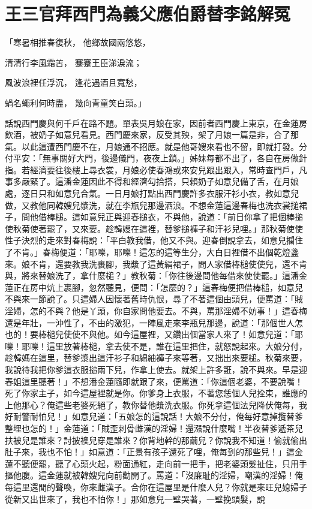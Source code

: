 %

\chapter{王三官拜西門為義父\KG 應伯爵替李銘解冤}


「寒暑相推春復秋，  他鄉故國兩悠悠，

清清行李風霜苦，  蹇蹇王臣涕淚流；

風波浪裡任浮沉，  逢花遇酒且寬愁，

蝸名蠅利何時盡，  幾向青童笑白頭。」

話說西門慶與何千戶在路不題。單表吳月娘在家，因前者西門慶上東京，在金蓮房飲酒，被奶子如意兒看見。西門慶來家，反受其殃，架了月娘一篇是非，合了那氣。以此這遭西門慶不在，月娘通不招應。就是他哥嫂來看也不留，即就打發。分付平安：「無事關好大門，後邊儀門，夜夜上鎖。」姊妹每都不出了，各自在房做針指。若經濟要往後樓上尋衣裳，月娘必使春鴻或來安兒跟出跟入，常時查門戶，凡事多嚴緊了。這潘金蓮因此不得和經濟勾拾搭，只賴奶子如意兒備了舌，在月娘處，逐日只和如意兒合氣。一日月娘打點出西門慶許多衣服汗衫小衣，教如意兒做，又教他同韓嫂兒漿洗，就在李瓶兒那邊洒浪。不想金蓮這邊春梅也洗衣裳搥裙子，問他借棒槌。這如意兒正與迎春搥衣，不與他，說道：「前日你拿了把個棒搥使秋菊使著罷了，又來要。趁韓嫂在這裡，替爹搥褲子和汗衫兒哩。」那秋菊使使性子決烈的走來對春梅說：「平白教我借，他又不與。迎春倒說拿去，如意兒攔住了不肯。」春梅便道：「耶嚛，耶嚛！這怎的這等生分，大白日裡借不出個乾燈盞來。娘不肯，還要教我洗裹腳，我漿了這黃絹裙子，問人家借棒槌使使兒，還不肯與，將來替娘洗了，拿什麼槌？」教秋菊：「你往後邊問他每借來使使罷。」這潘金蓮正在房中炕上裹腳，忽然聽見，便問：「怎麼的？」這春梅便把借棒槌，如意兒不與來一節說了。只這婦人因懷著舊時仇恨，尋了不著這個由頭兒，便罵道：「賊淫婦，怎的不與？他是丫頭，你自家問他要去。不與，罵那淫婦不妨事！」這春梅還是年壯，一沖性了，不由的激犯，一陣風走來李瓶兒那邊，說道：「那個世人怎也的！要棒槌兒使使不與他。如今這屋裡，又鑽出個當家人來了！如意兒道：「耶嚛！耶嚛！這里放著棒槌，拿去使不是，誰在這里把住，就怒說起來。大娘分付，趁韓媽在這里，替爹漿出這汗衫子和綿紬褲子來等著，又拙出來要槌。秋菊來要，我說待我把你爹這衣服搥兩下兒，作拿上使去。就架上許多誑，說不與來。早是迎春姐這里聽著！」不想潘金蓮隨即就跟了來，便罵道：「你這個老婆，不要說嘴！死了你家主子，如今這屋裡就是你。你爹身上衣服，不著您恁個人兒拴束，誰應的上他那心？俺這些老婆死絕了，教你替他漿洗衣服。你死拿這個法兒降伏俺每，我好耐警耐怕兒！」如意兒道：「五娘怎的這說話！大娘不分付，俺每好意掉攬替爹整埋也怎的！」金蓮道：「賊歪刺骨雌漢的淫婦！還漒說什麼嘴！半夜替爹遞茶兒扶被兒是誰來？討披襖兒穿是誰來？你背地幹的那繭兒？你說我不知道！偷就偷出肚子來，我也不怕！」如意道：「正景有孩子還死了哩，俺每到的那些兒！」這金蓮不聽便罷，聽了心頭火起，粉面通紅，走向前一把手，把老婆頭髮扯住，只用手摳他腹。這金蓮就被韓嫂兒向前勸開了。罵道：「沒廉耻的淫婦，嘲漢的淫婦！俺每這里還閒的聲喚，你來雌漢子。合你在這屋里是什麼人兒？你就是來旺兒媳婦子從新又出世來了，我也不怕你！」那如意兒一壁哭著，一壁挽頭髮，說